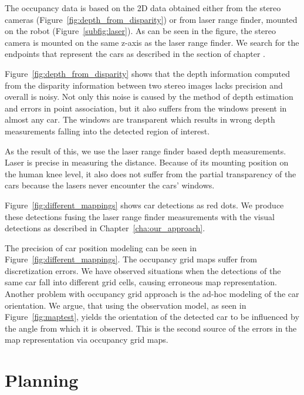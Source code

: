 The occupancy data is based on the 2D data obtained either from the stereo
cameras (Figure~\ref{fig:depth_from_disparity}) or from laser range finder,
mounted on the robot (Figure~\ref{subfig:laser}). As can be seen in the
figure, the stereo camera is mounted on the same z-axis as the laser range
finder. We search for the endpoints that represent the cars as described in
the section  of chapter .

Figure~\ref{fig:depth_from_disparity} shows that the depth information
computed from the disparity information between two stereo images lacks
precision and overall is noisy. Not only this noise is caused by the method of
depth estimation and errors in point association, but it also suffers from the
windows present in almost any car. The windows are transparent which results
in wrong depth measurements falling into the detected region of interest.

As the result of this, we use the laser range finder based depth measurements.
Laser is precise in measuring the distance. Because of its mounting position
on the human knee level, it also does not suffer from the partial transparency
of the cars because the lasers never encounter the cars' windows.

Figure~\ref{fig:different_mappings} shows car detections as red dots. We
produce these detections fusing the laser range finder measurements with the
visual detections as described in Chapter~\ref{cha:our_approach}.

The precision of car position modeling can be seen in
Figure~\ref{fig:different_mappings}. The occupancy grid maps suffer from
discretization errors. We have observed situations when the detections of the
same car fall into different grid cells, causing erroneous map representation.
Another problem with occupancy grid approach is the ad-hoc modeling of the car
orientation. We argue, that using the observation model, as seen in
Figure~\ref{fig:maptest}, yields the orientation of the detected car to be
influenced by the angle from which it is observed. This is the second source
of the errors in the map representation via occupancy grid maps.



\section{Planning}
\label{sec:planning_results}

